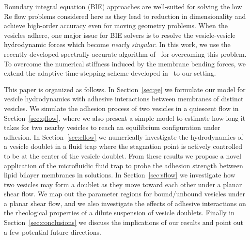 \documentclass[prf,superscriptaddress,showpacs]{revtex4-1}
\begin{document}
Boundary integral equation (BIE) approaches are well-suited for solving
the low Re flow problems considered here as they lead to reduction in
dimensionality and achieve high-order accuracy even for moving geometry
problems. When the vesicles adhere, one major issue for BIE solvers is
to resolve the vesicle-vesicle hydrodynamic forces which become {\em
nearly singular}. In this work, we use the recently developed
spectrally-accurate algorithm of~\cite{barnett2015spectrally} for
overcoming this problem. To overcome the numerical stiffness induced by
the membrane bending forces, we extend the adaptive time-stepping scheme
developed in~\cite{quaife2016adaptive} to our setting. 

This paper is organized as follows. In Section~\ref{sec:ge} we formulate
our model for vesicle hydrodynamics with adhesive interactions  between
membranes of distinct vesicles.  We simulate the adhesion process of two
vesicles in a quiescent flow in Section~\ref{sec:qflow}, where we also
present a simple model to estimate how long it takes for two nearby
vesicles to reach an equilibrium configuration under adhesion. In
Section~\ref{sec:eflow} we numerically investigate the hydrodynamics of
a vesicle doublet in a fluid trap where the stagnation point is actively
controlled to be at the center of the vesicle doublet. From these
results we propose a novel application of the microfluidic fluid trap to
probe the adhesion strength between lipid bilayer membranes in
solutions. In Section~\ref{sec:sflow} we investigate how two vesicles
may form a doublet as they move toward each other under a planar shear
flow.  We map out the parameter regions for bound/unbound vesicles under
a planar shear flow, and we also investigate the effects of adhesive
interactions on the rheological properties of a dilute suspension of
vesicle doublets.  Finally in Section~\ref{sec:conclusions} we discuss
the implications of our results and point out a few potential future
directions.

\end{document}
